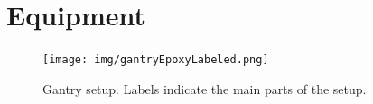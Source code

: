 \documentclass[12pt]{cornelltfpxsop}
\begin{document}

\section{Equipment}
\begin{center}
\begin{figure}[h!]
\texttt{[image: img/gantryEpoxyLabeled.png]}
\caption{Gantry setup. Labels indicate the main parts of the setup.}
\label{gantry_setup}
\end{figure}
\end{center}
\end{document}
